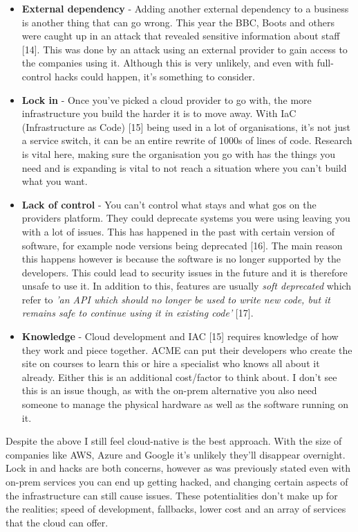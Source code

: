   \begin{itemize}
    \item \textbf{External dependency} - Adding another external dependency to a business is another thing that can go wrong. This year the BBC, Boots and
    others were caught up in an attack that revealed sensitive information about staff [14]. This was done by an attack using an external provider to gain 
    access to the companies using it. Although this is very unlikely, and even with full-control hacks could happen, it's something to consider.
    \item \textbf{Lock in} - Once you've picked a cloud provider to go with, the more infrastructure you build the harder it is to move away. With 
    IaC (Infrastructure as Code) [15] being used in a lot of organisations, it's not just a service switch, it can be an entire rewrite of 1000s of lines
    of code. Research is vital here, making sure the organisation you go with has the things you need and is expanding is vital to not reach a situation where
    you can't build what you want. 
    \item \textbf{Lack of control} - You can't control what stays and what gos on the providers platform. They could deprecate systems you were using leaving 
    you with a lot of issues. This has happened in the past with certain version of software, for example node versions being deprecated [16]. The main
    reason this happens however is because the software is no longer supported by the developers. This could lead to security issues in the future and it is 
    therefore unsafe to use it. In addition to this, features are usually \textit{soft deprecated} which refer to \textit{'an API which should no longer be 
    used to write new code, but it remains safe to continue using it in existing code'} [17].
    \item \textbf{Knowledge} - Cloud development and IAC [15] requires knowledge of how they work and piece together. ACME can put their developers who create
    the site on courses to learn this or hire a specialist who knows all about it already. Either this is an additional cost/factor to think about. I 
    don't see this is an issue though, as with the on-prem alternative you also need someone to manage the physical hardware as well as the software 
    running on it.
  \end{itemize}

  Despite the above I still feel cloud-native is the best approach. With the size of companies like AWS, Azure and Google it's unlikely they'll disappear
  overnight. Lock in and hacks are both concerns, however as was previously stated even with on-prem services you can end up getting hacked, and changing
  certain aspects of the infrastructure can still cause issues. These potentialities don't make up for the realities; speed of development, fallbacks, 
  lower cost and an array of services that the cloud can offer. 

